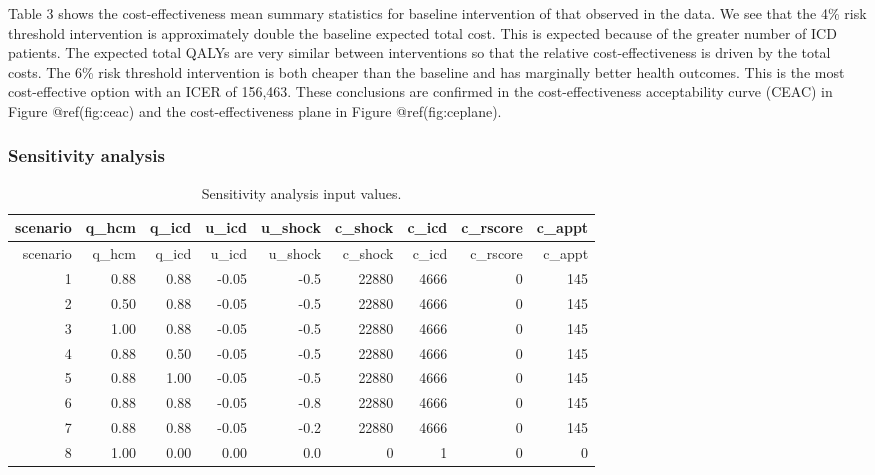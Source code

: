 \documentclass[
]{article}
\begin{document}
Table 3 shows the cost-effectiveness mean summary statistics for
baseline intervention of that observed in the data. We see that the 4\%
risk threshold intervention is approximately double the baseline
expected total cost. This is expected because of the greater number of
ICD patients. The expected total QALYs are very similar between
interventions so that the relative cost-effectiveness is driven by the
total costs. The 6\% risk threshold intervention is both cheaper than
the baseline and has marginally better health outcomes. This is the most
cost-effective option with an ICER of 156,463. These conclusions are
confirmed in the cost-effectiveness acceptability curve (CEAC) in Figure
@ref(fig:ceac) and the cost-effectiveness plane in Figure
@ref(fig:ceplane).

\hypertarget{sensitivity-analysis}{%
\subsubsection{Sensitivity analysis}\label{sensitivity-analysis}}

\begin{longtable}[]{@{}rrrrrrrrr@{}}
\caption{Sensitivity analysis input values.}\tabularnewline
\toprule
scenario & q\_hcm & q\_icd & u\_icd & u\_shock & c\_shock & c\_icd &
c\_rscore & c\_appt \\
\midrule
\endfirsthead
\toprule
scenario & q\_hcm & q\_icd & u\_icd & u\_shock & c\_shock & c\_icd &
c\_rscore & c\_appt \\
\midrule
\endhead
1 & 0.88 & 0.88 & -0.05 & -0.5 & 22880 & 4666 & 0 & 145 \\
2 & 0.50 & 0.88 & -0.05 & -0.5 & 22880 & 4666 & 0 & 145 \\
3 & 1.00 & 0.88 & -0.05 & -0.5 & 22880 & 4666 & 0 & 145 \\
4 & 0.88 & 0.50 & -0.05 & -0.5 & 22880 & 4666 & 0 & 145 \\
5 & 0.88 & 1.00 & -0.05 & -0.5 & 22880 & 4666 & 0 & 145 \\
6 & 0.88 & 0.88 & -0.05 & -0.8 & 22880 & 4666 & 0 & 145 \\
7 & 0.88 & 0.88 & -0.05 & -0.2 & 22880 & 4666 & 0 & 145 \\
8 & 1.00 & 0.00 & 0.00 & 0.0 & 0 & 1 & 0 & 0 \\
\bottomrule
\end{longtable}
\end{document}
